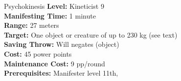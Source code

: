 {Psychokinesis}
{
	\textbf{Level:}
	Kineticist 9\\
	\textbf{Manifesting Time:}
	1 minute\\
	\textbf{Range:}
	27 meters\\
	\textbf{Target:}
	One object or creature of up to 230 kg (see text)\\
	\textbf{Saving Throw:}
	Will negates (object)\\
	\textbf{Cost:}
	45 power points\\
	\textbf{Maintenance Cost:}
	9 pp/round\\
	\textbf{Prerequisites:}
	Manifester level 11th, \\
}
